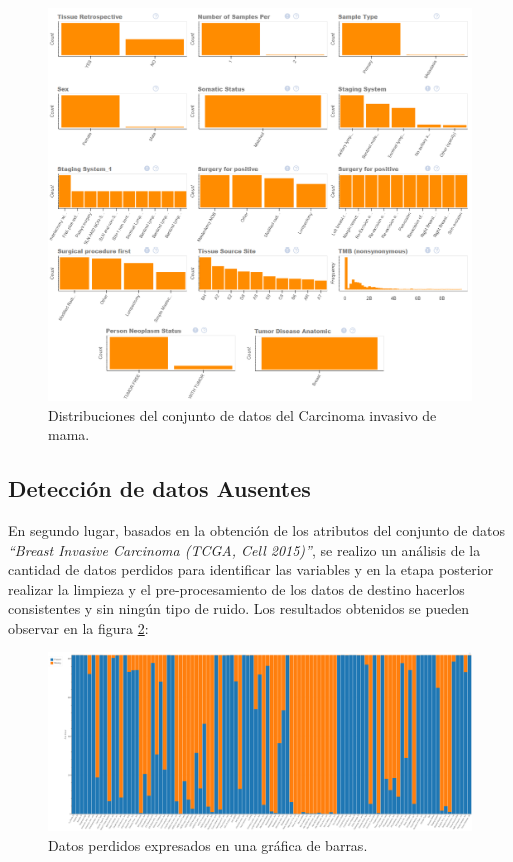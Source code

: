 \begin{figure}
	\centering
	\includegraphics[width=1
	\linewidth]{NOTEBOOK/IMAGES_EDA/5}
	\caption{Distribuciones del conjunto de datos del Carcinoma invasivo de mama.}\label{fig:foobar}
\end{figure}


\subsection{Detección de datos Ausentes}
En segundo lugar, basados en la obtención de los atributos del conjunto de datos \textit{“Breast Invasive Carcinoma (TCGA, Cell 2015)”}, se realizo un análisis de la cantidad de datos perdidos para identificar las variables y en la etapa posterior realizar la limpieza y el pre-procesamiento de los datos de destino hacerlos consistentes y sin ningún tipo de ruido. Los resultados obtenidos se pueden observar en la figura \ref{Missing_Bar_Chart}:


\begin{figure}[!htb]
	\centering
	\includegraphics[width=1
	\linewidth]{IMAGENES/Missing_Bar_Chart}
	\caption{Datos perdidos expresados en una gráfica de barras.}
	\label{Missing_Bar_Chart}
\end{figure}

